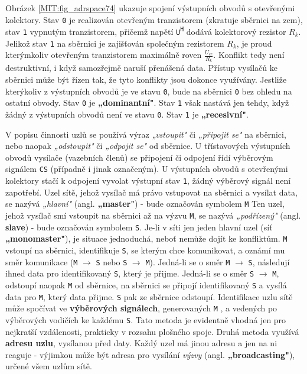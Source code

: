        Obrázek \ref{MIT:fig_adrspace74} ukazuje spojení výstupních obvodů s otevřenými kolektory. 
        Stav \texttt{0} je realizován otevřeným tranzistorem (zkratuje sběrnici na zem), stav 
        \texttt{1} vypnutým tranzistorem, přičemž napětí \texttt{U\textsuperscript{H}} dodává 
        kolektorový rezistor \(R_k\).  Jelikož stav \texttt{1} na sběrnici je zajišťován společným 
        rezistorem \(R_k\), je proud kterýmkoliv  otevřeným tranzistorem maximálně roven 
        \(\frac{U_{cc}}{R_k}\). Konflikt tedy není destruktivní, i když samozřejmě naruší přenášená 
        data. Přístup vysílačů ke sběrnici může být řízen tak, že tyto konflikty jsou dokonce 
        využívány. Jestliže kterýkoliv z výstupních obvodů je ve stavu \texttt{0}, bude na sběrnici 
        \texttt{0} bez ohledu na ostatní obvody. Stav \texttt{0} je \textbf{„dominantní"}. 
        Stav \texttt{1} však nastává jen tehdy, když žádný z výstupních obvodů není ve stavu 
        \texttt{0}. Stav \texttt{1} je \textbf{„recesivní"}.
        
        V popisu činnosti uzlů se používá výraz \emph{„vstoupit"} či \emph{„připojit se"} na 
        sběrnici, nebo naopak \emph{„odstoupit"} či \emph{„odpojit se"} od sběrnice. U třístavových 
        výstupních obvodů vysílače (vazebních členů) se připojení či odpojení řídí výběrovým 
        signálem \texttt{CS} (případně i jinak označeným). U výstupních obvodů s otevřenými 
        kolektory stačí k odpojení vyvolat výstupní stav \texttt{1}, žádný výběrový signál není 
        zapotřebí. Uzel sítě, jehož vysílač má právo vstupovat na sběrnici a vysílat data, se 
        nazývá \emph{„hlavní"} (angl. \textbf{„master"}) - bude označován symbolem \texttt{M} Ten 
        uzel, jehož vysílač smí vstoupit na sběrnici až na výzvu \texttt{M}, se nazývá 
        \emph{„podřízený"} (angl. \textbf{slave}) - bude označován symbolem \texttt{S}. Je-li v 
        síti jen jeden hlavní uzel (síť \textbf{„monomaster"}), je situace jednoduchá, neboť nemůže 
        dojít ke konfliktům. \texttt{M} vstoupí na sběrnici, identifikuje \texttt{S}, se kterým 
        chce komunikovat, a oznámí mu směr komunikace (\texttt{M} \(\rightarrow\) \texttt{S} nebo 
        \texttt{S} \(\rightarrow\) \texttt{M}). Jedná-li se o směr \texttt{M} \(\rightarrow\) 
        \texttt{S}, následují ihned data pro  identifikovaný \texttt{S}, který je přijme. Jedná-li 
        se o směr \texttt{S} \(\rightarrow\) \texttt{M}, odstoupí naopak \texttt{M} od sběrnice, na 
        sběrnici se připojí identifikovaný \texttt{S} a vysílá data pro \texttt{M}, který data 
        přijme. \texttt{S} pak ze sběrnice odstoupí. Identifikace uzlu sítě může spočívat ve 
        \textbf{výběrových signálech}, generovaných \texttt{M} , a vedených po výběrových 
        vodičích ke každému \texttt{S}. Tato metoda je evidentně vhodná jen pro nejkratší 
        vzdálenosti, prakticky v rozsahu plošného spoje. Druhá metoda využívá \textbf{adresu uzlu}, 
        vysílanou před daty. Každý uzel má jinou adresu a jen na ni reaguje - výjimkou může být 
        adresa pro vysílání \emph{výzvy} (angl. \textbf{„broadcasting"}), určené všem uzlům sítě.
        
